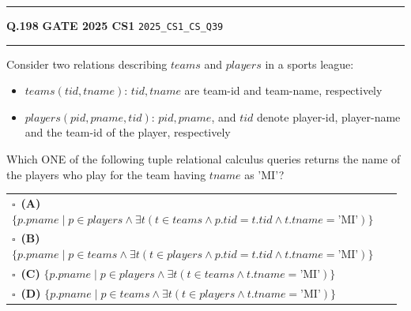 \documentclass[a4paper,10pt]{article}
\begin{document}
\vspace{6pt}\hrule height 0.35pt\vspace{6pt}
\noindent
\begin{tcolorbox}[
    blanker,
    sidebyside,
    sidebyside align=top,
    lefthand width=0.55\textwidth,
    top=4pt, bottom=4pt, left=0pt, right=0pt,
    middle=16pt,
    underlay={
        \draw[dashed, black!80, line width=0.8pt, dash pattern=on 4pt off 3pt]
            ([xshift=0.55\textwidth+8pt]frame.north west) --
            ([xshift=0.55\textwidth+8pt]frame.south west);
    }
]
\textbf{Q.198}  \hfill {\footnotesize\textbf{GATE 2025 CS1} \quad \tiny\texttt{2025\_CS1\_CS\_Q39}}
\vspace{2pt}\hrule height 0.3pt\vspace{4pt}

Consider two relations describing $teams$ and $players$ in a sports league:
\begin{itemize}
\item $teams(tid, tname)$: $tid, tname$ are team-id and team-name, respectively
\item $players(pid, pname, tid)$: $pid, pname$, and $tid$ denote player-id, player-name and the team-id of the player, respectively
\end{itemize}
Which ONE of the following tuple relational calculus queries returns the name of the players who play for the team having $tname$ as 'MI'?

\par\vspace{6pt}\noindent
\begin{tabular}{@{}p{0.98\linewidth}@{}}
$\square$\ \textbf{(A)} $\{ p.pname \mid p \in players \land \exists t (t \in teams \land p.tid = t.tid \land t.tname = \text{'MI'}) \}$ \\
\addlinespace[3pt]
$\square$\ \textbf{(B)} $\{ p.pname \mid p \in teams \land \exists t (t \in players \land p.tid = t.tid \land t.tname = \text{'MI'}) \}$ \\
\addlinespace[3pt]
$\square$\ \textbf{(C)} $\{ p.pname \mid p \in players \land \exists t (t \in teams \land t.tname = \text{'MI'}) \}$ \\
\addlinespace[3pt]
$\square$\ \textbf{(D)} $\{ p.pname \mid p \in teams \land \exists t (t \in players \land t.tname = \text{'MI'}) \}$
\end{tabular}

\tcblower


\end{tcolorbox}
\end{document}
